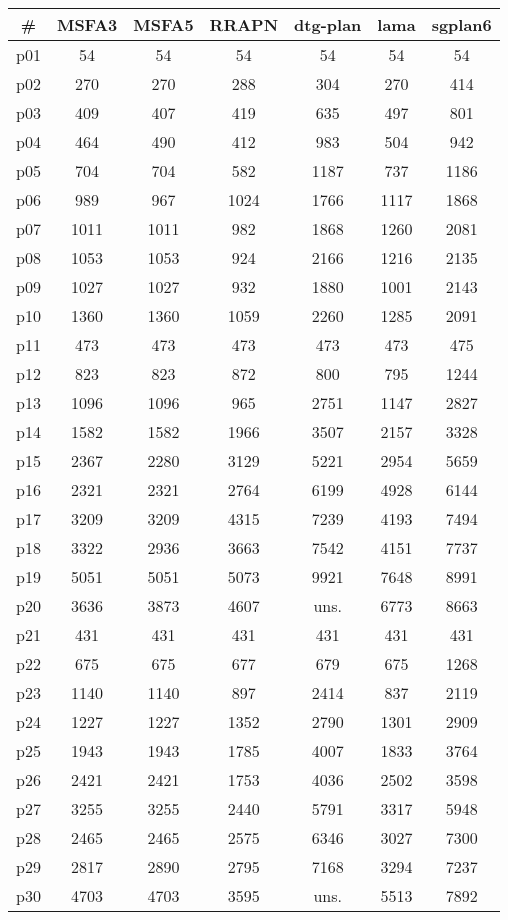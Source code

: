 \begin{tabular}{ccccccc}
\toprule
\textbf{\#} & \textbf{MSFA3} & \textbf{MSFA5} & \textbf{RRAPN} & \textbf{dtg-plan} & \textbf{lama} & \textbf{sgplan6}\\
\midrule
p01 & 54 & 54 & 54 & 54 & 54 & 54\\
p02 & 270 & 270 & 288 & 304 & 270 & 414\\
p03 & 409 & 407 & 419 & 635 & 497 & 801\\
p04 & 464 & 490 & 412 & 983 & 504 & 942\\
p05 & 704 & 704 & 582 & 1187 & 737 & 1186\\
p06 & 989 & 967 & 1024 & 1766 & 1117 & 1868\\
p07 & 1011 & 1011 & 982 & 1868 & 1260 & 2081\\
p08 & 1053 & 1053 & 924 & 2166 & 1216 & 2135\\
p09 & 1027 & 1027 & 932 & 1880 & 1001 & 2143\\
p10 & 1360 & 1360 & 1059 & 2260 & 1285 & 2091\\
p11 & 473 & 473 & 473 & 473 & 473 & 475\\
p12 & 823 & 823 & 872 & 800 & 795 & 1244\\
p13 & 1096 & 1096 & 965 & 2751 & 1147 & 2827\\
p14 & 1582 & 1582 & 1966 & 3507 & 2157 & 3328\\
p15 & 2367 & 2280 & 3129 & 5221 & 2954 & 5659\\
p16 & 2321 & 2321 & 2764 & 6199 & 4928 & 6144\\
p17 & 3209 & 3209 & 4315 & 7239 & 4193 & 7494\\
p18 & 3322 & 2936 & 3663 & 7542 & 4151 & 7737\\
p19 & 5051 & 5051 & 5073 & 9921 & 7648 & 8991\\
p20 & 3636 & 3873 & 4607 & uns. & 6773 & 8663\\
p21 & 431 & 431 & 431 & 431 & 431 & 431\\
p22 & 675 & 675 & 677 & 679 & 675 & 1268\\
p23 & 1140 & 1140 & 897 & 2414 & 837 & 2119\\
p24 & 1227 & 1227 & 1352 & 2790 & 1301 & 2909\\
p25 & 1943 & 1943 & 1785 & 4007 & 1833 & 3764\\
p26 & 2421 & 2421 & 1753 & 4036 & 2502 & 3598\\
p27 & 3255 & 3255 & 2440 & 5791 & 3317 & 5948\\
p28 & 2465 & 2465 & 2575 & 6346 & 3027 & 7300\\
p29 & 2817 & 2890 & 2795 & 7168 & 3294 & 7237\\
p30 & 4703 & 4703 & 3595 & uns. & 5513 & 7892\\
\bottomrule
\end{tabular}

